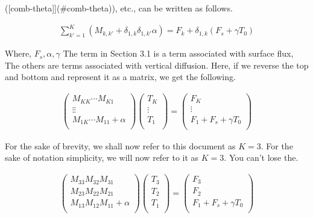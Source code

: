({[}comb-theta{]}{]}(\#comb-theta)), etc., can be written as follows.

\begin{eqnarray}
  \sum_{k'=1}^{K} ( M_{k,k'} + \delta_{1,k} \delta_{1,k'} \alpha)
    = F_k + \delta_{1,k} ( F_s + \gamma T_0 )
\end{eqnarray}

Where, \(F_s, \alpha, \gamma\) The term in Section 3.1 is a term
associated with surface flux, The others are terms associated with
vertical diffusion. Here, if we reverse the top and bottom and represent
it as a matrix, we get the following.

\begin{eqnarray}
  \left( \begin{array}{lll} M_{KK}  \cdots  M_{K1} \\ \vdots  
  \vdots \\ M_{1K}  \cdots  M_{11} + \alpha \\
\end{array}  \right)
\left( \begin{array}{l} T_K \\ \vdots \\ T_1 \\
\end{array}  \right)
= \left( \begin{array}{l} F_K \\ \vdots \\ F_1 + F_s + \gamma T_{0} \\
\end{array} \right)
\end{eqnarray}

For the sake of brevity, we shall now refer to this document as \(K=3\).
For the sake of notation simplicity, we will now refer to it as \(K=3\).
You can't lose the.

\begin{eqnarray}
  \left( \begin{array}{lll} M_{33}  M_{32}  M_{31} \\ M_{23} 
  M_{22}  M_{21} \\ M_{13}  M_{12}  M_{11} + \alpha \\
\end{array} \right)
\left( \begin{array}{l} T_3 \\ T_2 \\ T_1 \\
\end{array} \right)
= \left( \begin{array}{l} F_3 \\ F_2 \\ F_1 + F_s + \gamma T_{0} \\
\end{array} \right)
\end{eqnarray}

